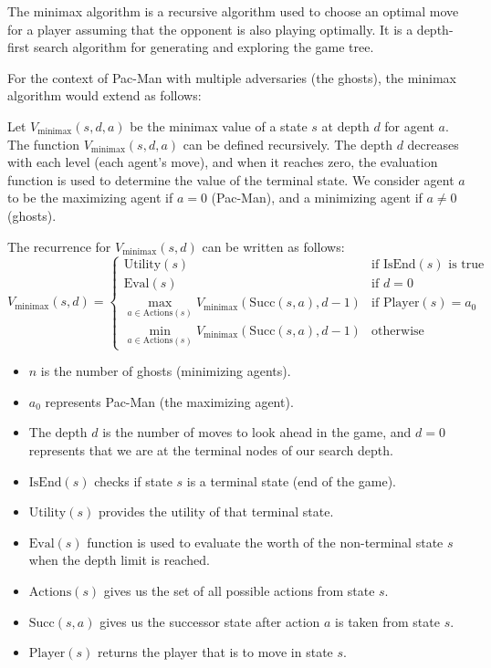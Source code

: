 \begin{answer}
The minimax algorithm is a recursive algorithm used to choose an optimal move for a player assuming that the opponent is also playing optimally. It is a depth-first search algorithm for generating and exploring the game tree.

For the context of Pac-Man with multiple adversaries (the ghosts), the minimax algorithm would extend as follows:

Let \( V_{\text{minimax}}(s, d, a) \) be the minimax value of a state \( s \) at depth \( d \) for agent \( a \). The function \( V_{\text{minimax}}(s, d, a) \) can be defined recursively. The depth \( d \) decreases with each level (each agent's move), and when it reaches zero, the evaluation function is used to determine the value of the terminal state. We consider agent \( a \) to be the maximizing agent if \( a = 0 \) (Pac-Man), and a minimizing agent if \( a \neq 0 \) (ghosts).

The recurrence for \( V_{\text{minimax}}(s, d) \) can be written as follows:
\[
V_{\text{minimax}}(s, d) = 
\begin{cases} 
\text{Utility}(s) & \text{if IsEnd}(s) \text{ is true} \\
\text{Eval}(s) & \text{if } d = 0 \\
\max_{a \in \text{Actions}(s)} V_{\text{minimax}}(\text{Succ}(s, a), d-1) & \text{if Player}(s) = a_0 \\
\min_{a \in \text{Actions}(s)} V_{\text{minimax}}(\text{Succ}(s, a), d-1) & \text{otherwise}
\end{cases}
\]

\begin{itemize}
\item \( n \) is the number of ghosts (minimizing agents).
\item \( a_0 \) represents Pac-Man (the maximizing agent).
\item The depth \( d \) is the number of moves to look ahead in the game, and \( d=0 \) represents that we are at the terminal nodes of our search depth.
\item \( \text{IsEnd}(s) \) checks if state \( s \) is a terminal state (end of the game).
\item \( \text{Utility}(s) \) provides the utility of that terminal state.
\item \( \text{Eval}(s) \) function is used to evaluate the worth of the non-terminal state \( s \) when the depth limit is reached.
\item \( \text{Actions}(s) \) gives us the set of all possible actions from state \( s \).
\item \( \text{Succ}(s, a) \) gives us the successor state after action \( a \) is taken from state \( s \).
\item \( \text{Player}(s) \) returns the player that is to move in state \( s \).
\end{itemize}


\end{answer}
